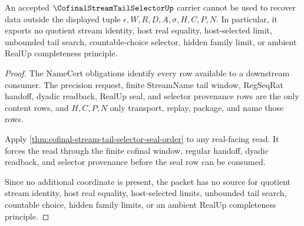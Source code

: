 \begin{theorem}
\label{thm:cofinal-stream-tail-selector-nonescape}
An accepted $\CofinalStreamTailSelectorUp$ carrier cannot be used to recover data outside the displayed tuple $\epsilon,W,R,D,A,\sigma,H,C,P,N$. In particular, it exports no quotient stream identity, host real equality, host-selected limit, unbounded tail search, countable-choice selector, hidden family limit, or ambient RealUp completeness principle.
\end{theorem}
\begin{proof}
The NameCert obligations identify every row available to a downstream consumer. The precision request, finite StreamName tail window, RegSeqRat handoff, dyadic readback, RealUp seal, and selector provenance rows are the only content rows, and $H,C,P,N$ only transport, replay, package, and name those rows.

Apply \autoref{thm:cofinal-stream-tail-selector-seal-order} to any real-facing read. It forces the read through the finite cofinal window, regular handoff, dyadic readback, and selector provenance before the seal row can be consumed.

Since no additional coordinate is present, the packet has no source for quotient stream identity, host real equality, host-selected limits, unbounded tail search, countable choice, hidden family limits, or an ambient RealUp completeness principle.
\end{proof}


